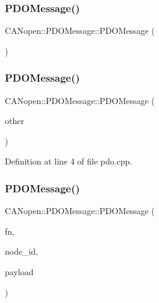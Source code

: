 \subsubsection{\texorpdfstring{P\+D\+O\+Message()}{PDOMessage()}\hspace{0.1cm}{\footnotesize\ttfamily [1/3]}}
{\footnotesize\ttfamily C\+A\+Nopen\+::\+P\+D\+O\+Message\+::\+P\+D\+O\+Message (\begin{DoxyParamCaption}{ }\end{DoxyParamCaption})\hspace{0.3cm}{\ttfamily [default]}}

\mbox{\label{class_c_a_nopen_1_1_p_d_o_message_a461a62c471761504043dfcb13f9ec685}} 
\subsubsection{\texorpdfstring{P\+D\+O\+Message()}{PDOMessage()}\hspace{0.1cm}{\footnotesize\ttfamily [2/3]}}
{\footnotesize\ttfamily C\+A\+Nopen\+::\+P\+D\+O\+Message\+::\+P\+D\+O\+Message (\begin{DoxyParamCaption}\item[{const can\+\_\+frame \&}]{other }\end{DoxyParamCaption})}



Definition at line 4 of file pdo.\+cpp.

\mbox{\label{class_c_a_nopen_1_1_p_d_o_message_ae7f8db2be338aaa9cc61f08520fa0c85}} 
\subsubsection{\texorpdfstring{P\+D\+O\+Message()}{PDOMessage()}\hspace{0.1cm}{\footnotesize\ttfamily [3/3]}}
{\footnotesize\ttfamily C\+A\+Nopen\+::\+P\+D\+O\+Message\+::\+P\+D\+O\+Message (\begin{DoxyParamCaption}\item[{\hyperlink{class_c_a_nopen_1_1_p_d_o_message_ab46579ce08cec30d0bc60428053cb39f}{P\+D\+O\+Function\+Code}}]{fn,  }\item[{uint8\+\_\+t}]{node\+\_\+id,  }\item[{\hyperlink{class_c_a_nopen_1_1_payload}{Payload}}]{payload }\end{DoxyParamCaption})}



